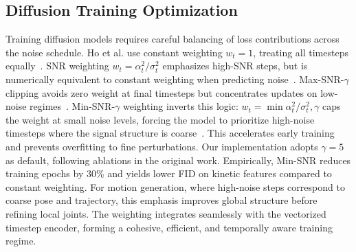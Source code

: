 \subsection{Diffusion Training Optimization}
Training diffusion models requires careful balancing of loss contributions across the noise schedule. Ho et al. use constant weighting $w_t = 1$, treating all timesteps equally~\cite{ddpm2020}. SNR weighting $w_t = \alpha_t^2 / \sigma_t^2$ emphasizes high-SNR steps, but is numerically equivalent to constant weighting when predicting noise~\cite{impddpm2021}. Max-SNR-$\gamma$ clipping avoids zero weight at final timesteps but concentrates updates on low-noise regimes~\cite{pdfsdm2022}. Min-SNR-$\gamma$ weighting inverts this logic: $w_t = \min{\alpha_t^2 / \sigma_t^2, \gamma}$ caps the weight at small noise levels, forcing the model to prioritize high-noise timesteps where the signal structure is coarse~\cite{minsnr2024}. This accelerates early training and prevents overfitting to fine perturbations. Our implementation adopts $\gamma=5$ as default, following ablations in the original work. Empirically, Min-SNR reduces training epochs by 30\% and yields lower FID on kinetic features compared to constant weighting. For motion generation, where high-noise steps correspond to coarse pose and trajectory, this emphasis improves global structure before refining local joints. The weighting integrates seamlessly with the vectorized timestep encoder, forming a cohesive, efficient, and temporally aware training regime.